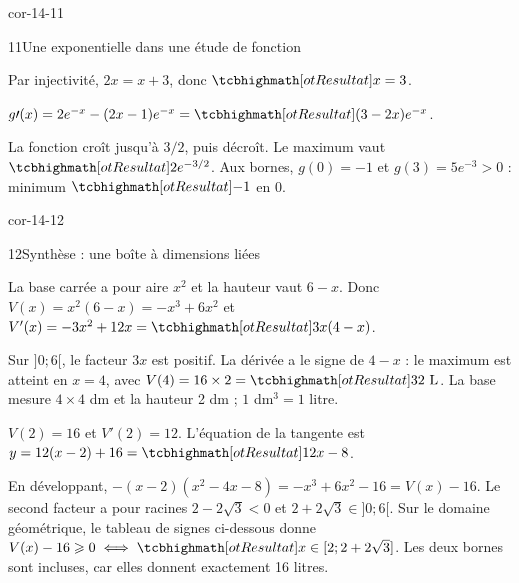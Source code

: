 \begin{blocLivre}{cor-14-11}
\begin{corrige}{11}{Une exponentielle dans une étude de fonction}
\begin{questions}
\item Par injectivité, $2x=x+3$, donc $\res{x=3}$.
\item $g\prime(x)=2e^{-x}-(2x-1)e^{-x}=\res{(3-2x)e^{-x}}$.
\item La fonction croît jusqu’à $3/2$, puis décroît. Le maximum vaut $\res{2e^{-3/2}}$. Aux bornes, $g(0)=-1$ et $g(3)=5e^{-3}>0$ : minimum $\res{-1}$ en 0.
\end{questions}
\label{figlivre-r14-11-var-cor}

\end{corrige}
\end{blocLivre}
\begin{blocLivre}{cor-14-12}
\begin{corrige}{12}{Synthèse : une boîte à dimensions liées}
\begin{questions}
\item La base carrée a pour aire $x^2$ et la hauteur vaut $6-x$.
Donc $V(x)=x^2(6-x)=-x^3+6x^2$ et $V'(x)=-3x^2+12x=\res{3x(4-x)}$.
\item Sur $]0;6[$, le facteur $3x$ est positif. La dérivée a le signe de $4-x$ :
le maximum est atteint en $x=4$, avec $V(4)=16\times2=\res{32\text{ L}}$.
La base mesure $4\times4$ dm et la hauteur 2 dm ; $1$ dm$^3=1$ litre.
\item $V(2)=16$ et $V'(2)=12$. L’équation de la tangente est
$y=12(x-2)+16=\res{12x-8}$.
\item En développant, $-(x-2)(x^2-4x-8)=-x^3+6x^2-16=V(x)-16$.
Le second facteur a pour racines $2-2\sqrt3<0$ et $2+2\sqrt3\in]0;6[$.
Sur le domaine géométrique, le tableau de signes ci-dessous donne
$V(x)-16\geq0\iff\res{x\in[2;2+2\sqrt3]}$.
Les deux bornes sont incluses, car elles donnent exactement 16 litres.
\end{questions}

\label{figlivre-r14-12-var-cor}

\label{figlivre-r14-12-signes-cor}

\label{figlivre-r14-12-boite-cor}

\end{corrige}
\end{blocLivre}
